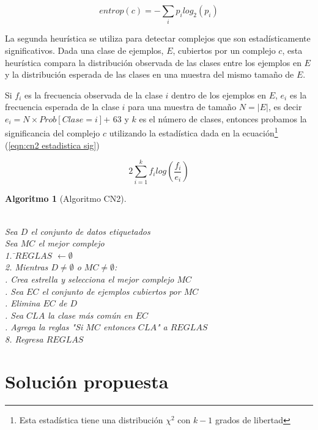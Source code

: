 \documentclass[12pt]{scrbook}
\theoremstyle{break}
\theoremstyle{break}
\newtheorem{algoritmo}{Algoritmo}[chapter]
\begin{document}
\begin{equation} \label{eqn:entropia complejo}
entrop(c) = - \sum_{i} p_i log_{2}(p_{i})
\end{equation}

La segunda heurística se utiliza para detectar complejos que son estadísticamente significativos. Dada una clase de ejemplos, $E$, cubiertos por un complejo $c$, esta heurística compara la distribución observada de las clases entre los ejemplos en $E$ y la distribución esperada de las clases en una muestra del mismo tamaño de $E$.

Si $f_i$ es la frecuencia observada de la clase $i$ dentro de los ejemplos en $E$, $e_{i}$ es la frecuencia esperada de la clase $i$ para una muestra de tamaño $N=\vert E \vert$, es decir $e_i = N \times Prob\left[ Clase = i \right]$+
63 y $k$ es el número de clases, entonces probamos la significancia del complejo $c$ utilizando la estadística dada en la ecuación\footnote{Esta estadística tiene una distribución $\chi^2$ con $k-1$ grados de libertad } (\ref{eqn:cn2 estadistica sig})

\begin{equation} \label{eqn:cn2 estadistica sig}
2 \sum_{i=1}^{k} f_{i} log\left(\frac{f_{i}} {e_{i}} \right)
\end{equation}

\begin{algoritmo}[Algoritmo CN2]
\begin{tabbing}
\\Sea $D$ el conjunto de datos etiquetados
\\Sea $MC$ el mejor complejo\\
1. \=$REGLAS$ $\leftarrow \emptyset $ \\
2. Mientras $D \neq \emptyset$ o $MC \neq \emptyset$:\\
 . Crea estrella y selecciona el mejor complejo $MC$\\
 . Sea $EC$ el conjunto de ejemplos cubiertos por $MC$ \\
 . Elimina $EC$ de $D$\\
 . Sea $CLA$ la clase más común en $EC$\\
 . Agrega la reglas "Si $MC$ entonces $CLA$" a $REGLAS$\\
8. Regresa $REGLAS$
\end{tabbing}
\label{algo:CN2}
\end{algoritmo}

\chapter{Solución propuesta}
\label{capitulo:solucion propuesta}
\end{document}
